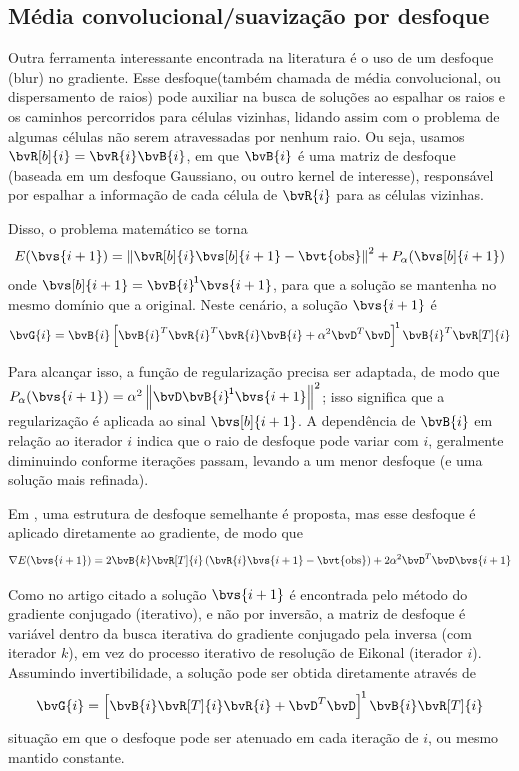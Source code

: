 \subsection{Média convolucional/suavização por desfoque}

Outra ferramenta interessante encontrada na literatura \cite{phillips_traveltime_1991,meyerholtz_convolutional_1989} é o uso de um \gls{desfoque} (blur) no gradiente. Esse desfoque(também chamada de média convolucional, ou dispersamento de raios) pode auxiliar na busca de soluções ao espalhar os raios e os caminhos percorridos para células vizinhas, lidando assim com o problema de algumas células não serem atravessadas por nenhum raio. Ou seja, usamos $\bvR[b]{i} = \bvR{i} \bvB{i}$, em que $\bvB{i}$ é uma matriz de desfoque (baseada em um desfoque Gaussiano, ou outro kernel de interesse), responsável por espalhar a informação de cada célula de $\bvR{i}$ para as células vizinhas.

Disso, o problema matemático se torna
\begin{equation}	
	E(\bvs{i+1}) = \norm{\bvR[b]{i} \bvs[b]{i+1} - \bvt{\obs}}^2 + P_\alpha(\bvs[b]{i+1})
\end{equation}
onde $\bvs[b]{i+1} = \inv{\bvB{i}} \bvs{i+1}$, para que a solução se mantenha no mesmo domínio que a original. Neste cenário, a solução $\bvs{i+1}$ é
\begin{equation}	
	\bvG{i} = \bvB{i} \inv*{\tr{\bvB{i}} \tr{\bvR{i}} \bvR{i} \bvB{i} + \alpha^2 \tr{\bvD}\bvD} \tr{\bvB{i}} \bvR[T]{i}
\end{equation}

Para alcançar isso, a função de regularização precisa ser adaptada, de modo que $P_{\alpha}(\bvs{i+1}) = \alpha^2 \norm{\bvD \inv{\bvB{i}} \bvs{i+1}}^2$; isso significa que a regularização é aplicada ao sinal $\bvs[b]{i+1}$. A dependência de $\bvB{i}$ em relação ao iterador $i$ indica que o raio de desfoque pode variar com $i$, geralmente diminuindo conforme iterações passam, levando a um menor desfoque (e uma solução mais refinada).

Em \cite{ali_opensource_2019}, uma estrutura de desfoque semelhante é proposta, mas esse desfoque é aplicado diretamente ao gradiente, de modo que
\begin{equation}	
	\nabla E(\bvs{i+1}) = 2 \bvB{k} \bvR[T]{i}\pts{\bvR{i} \bvs{i+1} - \bvt{\obs}} + 2 \alpha^2 \tr{\bvD}\bvD \bvs{i+1}
\end{equation}

Como no artigo citado a solução $\bvs{i+1}$ é encontrada pelo método do gradiente conjugado (iterativo), e não por inversão, a matriz de desfoque é variável dentro da busca iterativa do gradiente conjugado pela inversa (com iterador $k$), em vez do processo iterativo de resolução de Eikonal (iterador $i$). Assumindo invertibilidade, a solução pode ser obtida diretamente através de
\begin{equation}		
	\bvG{i} = \inv*{\bvB{i} \bvR[T]{i} \bvR{i} + \tr{\bvD}\bvD}\bvB{i} \bvR[T]{i}
\end{equation}
situação em que o desfoque pode ser atenuado em cada iteração de $i$, ou mesmo mantido constante.

